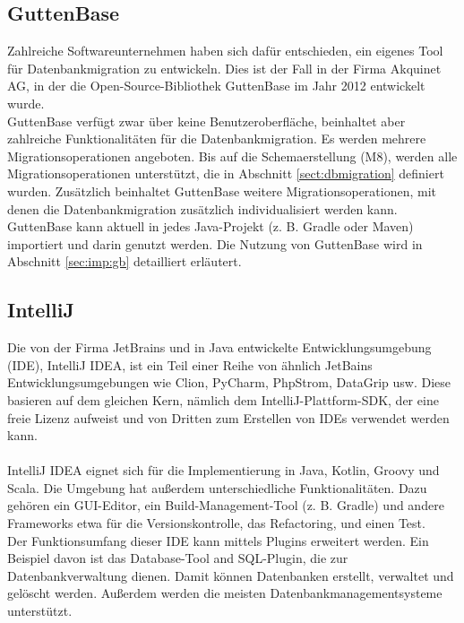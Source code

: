 \subsection{GuttenBase}

\label{section:grundlagen:gb}
Zahlreiche Softwareunternehmen haben sich dafür entschieden, ein eigenes Tool für Datenbankmigration zu entwickeln. Dies ist der Fall in der Firma Akquinet AG, in der die Open-Source-Bibliothek GuttenBase im Jahr 2012 entwickelt wurde.\\
GuttenBase verfügt zwar über keine Benutzeroberfläche, beinhaltet aber zahlreiche Funktionalitäten für die Datenbankmigration. Es werden mehrere Migrationsoperationen angeboten. Bis auf die Schemaerstellung (M8), werden alle Migrationsoperationen unterstützt, die in Abschnitt \ref{sect:dbmigration} definiert wurden. Zusätzlich beinhaltet GuttenBase weitere Migrationsoperationen, mit denen die Datenbankmigration zusätzlich  individualisiert werden kann.\\
GuttenBase kann aktuell in jedes Java-Projekt (z. B. Gradle oder Maven) importiert und darin genutzt werden. Die Nutzung von GuttenBase wird in Abschnitt \ref{sec:imp:gb} detailliert erläutert.
%
%

\subsection{IntelliJ}

Die von der Firma JetBrains und in Java entwickelte Entwicklungsumgebung (IDE), IntelliJ IDEA, ist ein Teil einer Reihe von ähnlich JetBains Entwicklungsumgebungen wie Clion, PyCharm, PhpStrom, DataGrip usw. Diese basieren  auf dem gleichen Kern, nämlich dem IntelliJ-Plattform-SDK, der eine freie Lizenz aufweist und von Dritten zum Erstellen von IDEs verwendet werden kann.\\ \\
IntelliJ IDEA eignet sich für die Implementierung in Java, Kotlin, Groovy und Scala. Die Umgebung hat außerdem unterschiedliche Funktionalitäten. Dazu gehören ein GUI-Editor, ein Build-Management-Tool (z. B. Gradle) und andere Frameworks etwa für die Versionskontrolle, das Refactoring, und einen Test.\\
Der Funktionsumfang dieser IDE kann mittels Plugins erweitert werden. Ein Beispiel davon ist das Database-Tool and SQL-Plugin, die zur Datenbankverwaltung dienen. Damit können Datenbanken erstellt, verwaltet und gelöscht werden. Außerdem werden die meisten Datenbankmanagementsysteme unterstützt.




